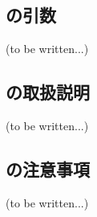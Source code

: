 \subsection{\OtoolLengthA の引数\TBW}
(to be written...)


\subsection{\OtoolLengthA の取扱説明\TBW}
(to be written...)


\subsection{\OtoolLengthA の注意事項\TBW}
(to be written...)
